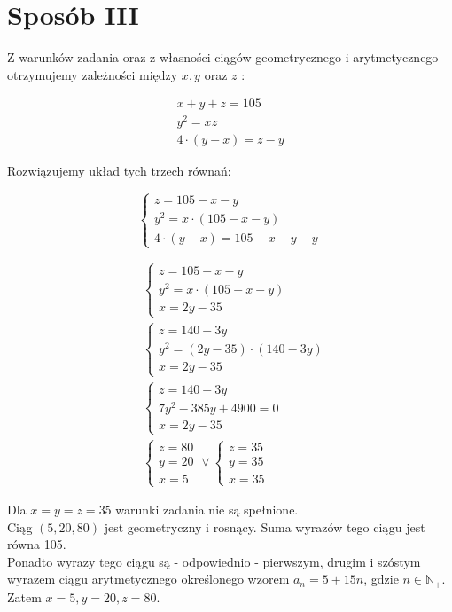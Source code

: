 \documentclass[10pt]{article}
\begin{document}
\section*{Sposób III}
Z warunków zadania oraz z własności ciągów geometrycznego i arytmetycznego otrzymujemy zależności między $x, y$ oraz $z$ :

$$
\begin{gathered}
x+y+z=105 \\
y^{2}=x z \\
4 \cdot(y-x)=z-y
\end{gathered}
$$

Rozwiązujemy układ tych trzech równań:

$$
\left\{\begin{array}{l}
z=105-x-y \\
y^{2}=x \cdot(105-x-y) \\
4 \cdot(y-x)=105-x-y-y
\end{array}\right.
$$

$$
\begin{aligned}
& \left\{\begin{array}{l}
z=105-x-y \\
y^{2}=x \cdot(105-x-y) \\
x=2 y-35
\end{array}\right. \\
& \left\{\begin{array}{l}
z=140-3 y \\
y^{2}=(2 y-35) \cdot(140-3 y) \\
x=2 y-35
\end{array}\right. \\
& \left\{\begin{array}{l}
z=140-3 y \\
7 y^{2}-385 y+4900=0 \\
x=2 y-35
\end{array}\right. \\
& \left\{\begin{array} { l } 
{ z = 8 0 } \\
{ y = 2 0 } \\
{ x = 5 }
\end{array} \vee \left\{\begin{array}{l}
z=35 \\
y=35 \\
x=35
\end{array}\right.\right.
\end{aligned}
$$

Dla $x=y=z=35$ warunki zadania nie są spełnione.\\
Ciąg $(5,20,80)$ jest geometryczny i rosnący. Suma wyrazów tego ciągu jest równa 105.\\
Ponadto wyrazy tego ciągu są - odpowiednio - pierwszym, drugim i szóstym wyrazem ciągu arytmetycznego określonego wzorem $a_{n}=5+15 n$, gdzie $n \in \mathbb{N}_{+}$.\\
Zatem $x=5, y=20, z=80$.
\end{document}
